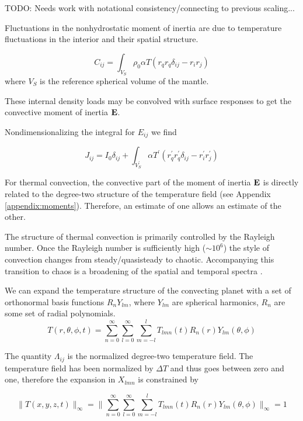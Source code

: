 \documentclass[extra,mreferee]{gji}
\begin{document}
TODO: Needs work with notational consistency/connecting to previous scaling...

Fluctuations in the nonhydrostatic moment of inertia are due to temperature fluctuations in the interior and their spatial structure.

\begin{equation}
C_{ij} = \int_{V_S} \rho_0 \alpha T \left( r_q r_q \delta_{ij} - r_i r_j \right) 
\end{equation}
where $V_S$ is the reference spherical volume of the mantle.

These internal density loads may be convolved with surface responses to get the convective moment of inertia $\bf E$.

Nondimensionalizing the integral for $E_{ij}$ we find

\begin{equation}
J_{ij} = I_0 \delta_{ij} + \int_{V_S^\prime} \alpha T^\prime \left( r_q^\prime r_q^\prime \delta_{ij} - r_i^\prime r_j^\prime \right) 
\end{equation}


For thermal convection, the convective part of the moment of inertia $\bf E$ is directly related to the degree-two structure of the temperature field (see Appendix \ref{appendix:moments}).
Therefore, an estimate of one allows an estimate of the other.


The structure of thermal convection is primarily controlled by the Rayleigh number.  Once the Rayleigh number is sufficiently high ($\sim10^6$) 
the style of convection changes from steady/quasisteady to chaotic.  Accompanying this transition to chaos is a broadening of the spatial 
and temporal spectra \citep{mclaughlin1982transition}.  

We can expand the temperature structure of the convecting planet with a set of orthonormal basis functions $R_n Y_{lm}$, 
where $Y_{lm}$ are spherical harmonics, $R_n$ are some set of radial polynomials.  
\begin{equation} 
T( r , \theta, \phi, t )  = {\displaystyle \sum_{n=0}^\infty \sum_{l=0}^\infty \sum_{m=-l}^{l} } T_{lmn}(t) R_n(r) Y_{lm} (\theta , \phi)
\label{T_series}
\end{equation}

The quantity $\Lambda_{ij}$ is the normalized degree-two temperature field.  The temperature field has been normalized by $\Delta T$ and thus goes between zero and one, therefore the expansion in $X_{lmn}$ is constrained by

\begin{equation}
\lVert T(x,y,z, t) \rVert_\infty = \lVert {\displaystyle \sum_{n=0}^\infty \sum_{l=0}^\infty \sum_{m=-l}^{l} } T_{lmn}(t) R_n(r) Y_{lm} (\theta , \phi) \rVert_\infty = 1
\end{equation}
\end{document}
